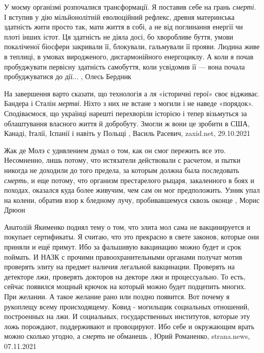 У моєму організмі розпочалися трансформації. Я поставив себе на грань \emph{смерті}. І
вступив у дію мільйонолітній еволюційний рефлекс, древня материнська здатність
жити просто так, мати життя в собі, а не від поглинання енергії чи плоті інших
істот. Ця здатність не діяла досі, бо хворобливе буття, умови покаліченої
біосфери закривали її, блокували, гальмували її прояви. Людина живе в теплиці,
в умовах виродженого, дисгармонійного енергоциклу. А коли я почав пробуджувати
первісну здатність самобуття, коли усвідомив її — вона почала пробуджуватися до
дії...
, Олесь Бердник

На завершення варто сказати, що технологія а ля «історичні герої» своє
відживає. Бандера і Сталін \emph{мертві}. Ніхто з них не встане з могили і не наведе
«порядок». Сподіваємося, що українці нарешті перехворіли історією і тепер
візьмуться за облаштування власного життя й добробуту. Змогли ж вони це зробити
в США, Канаді, Італії, Іспанії і навіть у Польщі
, 
Василь Расевич, zaxid.net, 29.10.2021

Жак де Молэ с удивлением думал о том, как он  смог  пережить  все  это.
Несомненно, лишь потому, что истязатели действовали с  расчетом,  и  пытки
никогда не доходили до того предела, за которым  должна  была  последовать
\emph{смерть}, и еще потому, что организм престарелого рыцаря, закаленного в боях и
походах, оказался куда более живучим, чем сам он мог предположить.  Узник упал
на колени, обратив  взор  к  бледному  лучу,  пробивавшемуся сквозь оконце
, Морис Дрюон

Анатолій Якименко поднял тему о том, что элита мол сама не вакцинируется и
покупает сертификаты. Я считаю, что это прекрасно в свете законов, которые они
приняли и ещё примут.  Ибо за фальшивую вакцинацию можно будет и срок поймать.
И НАЗК с прочими правоохранительными органами получат мотив проверять элиту на
предмет наличия легальной вакцинации. Проверять на детекторе лжи, проверять
докторов на декторе лжи и процессуально.  То есть, сейчас появился мощный
крючок на который можно будет подцепить многих. При желании. А такое желание
рано или поздно появится.  Вот почему я рукоплещу всему происходящему. Ковид -
могильщик социальных отношений, построенных на лжи. И социальных,
государственных институтов, которые эту ложь порождают, поддерживают и
провоцируют. Ибо себе и окружающим врать можно сколько угодно, а \emph{смерть}
не обманешь
, 
Юрий Романенко, strana.news, 07.11.2021
